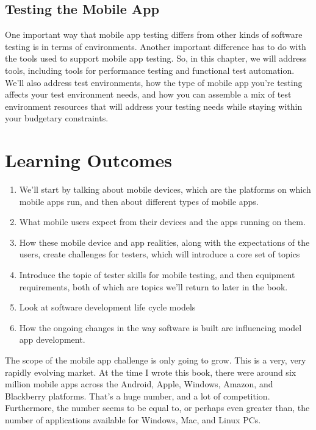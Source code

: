 \subsection{Testing the Mobile App}

One important way that mobile app testing differs from other kinds of software testing is in terms of environments. Another important difference has to do with the tools used to support mobile app testing. So, in this chapter, we will address tools, including tools for performance testing and functional test automation. We’ll also address test environments, how the type of mobile app you’re testing affects your test environment needs, and how you can assemble a mix of test environment resources that will address your testing needs while staying within your budgetary constraints.
\newline
\section{Learning Outcomes}
\begin{enumerate}

\item We’ll start by talking about mobile devices, which are the platforms on which mobile apps run, and then about different types of mobile apps. 

\item What mobile users expect from their devices and the apps running on them. 

\item How these mobile device and app realities, along with the expectations of the users, create challenges for testers, which will introduce a core set of topics 

\item Introduce the topic of tester skills for mobile testing, and then equipment requirements, both of which are topics we’ll return to later in the book. 

\item Look at software development life cycle models

\item How the ongoing changes in the way software is built are influencing model app development.

\end{enumerate}

The scope of the mobile app challenge is only going to grow. This is a very, very rapidly evolving market. At the time I wrote this book, there were around six million mobile apps across the Android, Apple, Windows, Amazon, and Blackberry platforms. That’s a huge number, and a lot of competition. Furthermore, the number seems to be equal to, or perhaps even greater than, the number of applications available for Windows, Mac, and Linux PCs.

